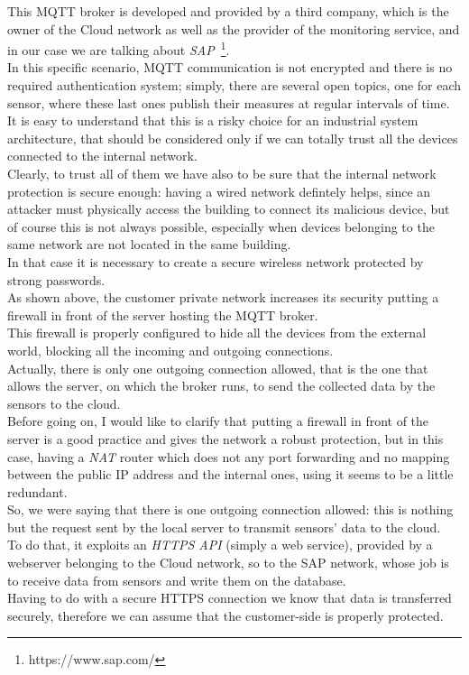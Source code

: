 \documentclass[12pt]{report}
\begin{document}
{{This MQTT broker is developed and provided by a third company, which is the owner of the Cloud network as well as the provider of the monitoring service, and in our case we are talking about \emph{SAP}~\footnote{https://www.sap.com/}.\\
In this specific scenario, MQTT communication is not encrypted and there is no required authentication system; simply, there are several open topics, one for each sensor, where these last ones publish their measures at regular intervals of time.\\
It is easy to understand that this is a risky choice for an industrial system architecture, that should be considered only if we can totally trust all the devices connected to the internal network.\\
Clearly, to trust all of them we have also to be sure that the internal network protection is secure enough: having a wired network defintely helps, since an attacker must physically access the building to connect its malicious device, but of course this is not always possible, especially when devices belonging to the same network are not located in the same building.\\
In that case it is necessary to create a secure wireless network protected by strong passwords.\\

As shown above, the customer private network increases its security putting a firewall in front of the server hosting the MQTT broker.\\
This firewall is properly configured to hide all the devices from the external world, blocking all the incoming and outgoing connections.\\
Actually, there is only one outgoing connection allowed, that is the one that allows the server, on which the broker runs, to send the collected data by the sensors to the cloud.\\
Before going on, I would like to clarify that putting a firewall in front of the server is a good practice and gives the network a robust protection, but in this case, having a \emph{NAT} router which does not any port forwarding and no mapping between the public IP address and the internal ones, using it seems to be a little redundant.\\

So, we were saying that there is one outgoing connection allowed: this is nothing but the request sent by the local server to transmit sensors' data to the cloud.\\
To do that, it exploits an \emph{HTTPS API} (simply a web service), provided by a webserver belonging to the Cloud network, so to the SAP network, whose job is to receive data from sensors and write them on the database.\\
Having to do with a secure HTTPS connection we know that data is transferred securely, therefore we can assume that the customer-side is properly protected.\\

}}
\end{document}
